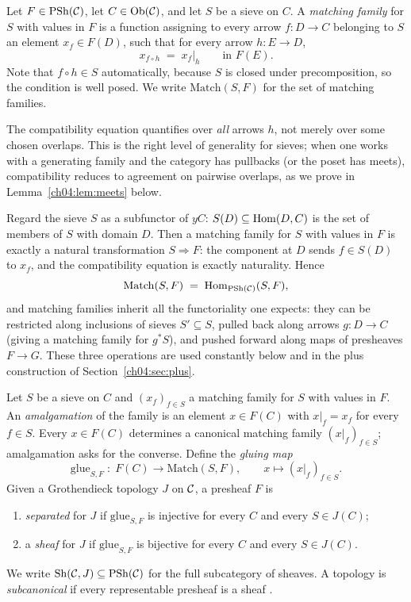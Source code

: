 \begin{definition}\label{ch04:def:matching}
Let $F\in\mathrm{PSh}(\mathcal{C})$, let $C\in\mathrm{Ob}(\mathcal{C})$, and let $S$ be a sieve on $C$. A
\emph{matching family} for $S$ with values in $F$ is a function assigning to
every arrow $f:D\to C$ belonging to $S$ an element $x_f\in F(D)$, such that
for every arrow $h:E\to D$,
\[
x_{f\circ h} \;=\; x_f|_h \qquad\text{in } F(E).
\]
Note that $f\circ h\in S$ automatically, because $S$ is closed under
precomposition, so the condition is well posed. We write
$\mathrm{Match}(S,F)$ for the set of matching families.
\end{definition}

The compatibility equation quantifies over \emph{all} arrows $h$, not merely
over some chosen overlaps. This is the right level of generality for sieves;
when one works with a generating family and the category has pullbacks (or the
poset has meets), compatibility reduces to agreement on pairwise overlaps, as
we prove in Lemma~\ref{ch04:lem:meets} below.

\begin{remark}\label{ch04:rem:nat}
Regard the sieve $S$ as a subfunctor of $yC$: $S(D)\subseteq\mathrm{Hom}(D,C)$ is the
set of members of $S$ with domain $D$. Then a matching family for $S$ with
values in $F$ is exactly a natural transformation $S\Rightarrow F$: the
component at $D$ sends $f\in S(D)$ to $x_f$, and the compatibility equation is
exactly naturality. Hence
\[
\mathrm{Match}(S,F)\;=\;\mathrm{Hom}_{\mathrm{PSh}(\mathcal{C})}(S,F),
\]
and matching families inherit all the functoriality one expects: they can be
restricted along inclusions of sieves $S'\subseteq S$, pulled back along
arrows $g:D\to C$ (giving a matching family for $g^{*}S$), and pushed forward
along maps of presheaves $F\to G$. These three operations are used constantly
below and in the plus construction of Section~\ref{ch04:sec:plus}.
\end{remark}

\begin{definition}\label{ch04:def:sheaf}
Let $S$ be a sieve on $C$ and $(x_f)_{f\in S}$ a matching family for $S$ with
values in $F$. An \emph{amalgamation} of the family is an element $x\in F(C)$
with $x|_f=x_f$ for every $f\in S$. Every $x\in F(C)$ determines a canonical
matching family $(x|_f)_{f\in S}$; amalgamation asks for the converse. Define
the \emph{gluing map}
\[
\mathrm{glue}_{S,F}\;:\;F(C)\longrightarrow \mathrm{Match}(S,F),\qquad
x\longmapsto (x|_f)_{f\in S}.
\]
Given a Grothendieck topology $J$ on $\mathcal{C}$, a presheaf $F$ is
\begin{enumerate}
\item \emph{separated} for $J$ if $\mathrm{glue}_{S,F}$ is injective for every
$C$ and every $S\in J(C)$;
\item a \emph{sheaf} for $J$ if $\mathrm{glue}_{S,F}$ is bijective for every
$C$ and every $S\in J(C)$.
\end{enumerate}
We write $\mathrm{Sh}(\mathcal{C},J)\subseteq\mathrm{PSh}(\mathcal{C})$ for the full subcategory of sheaves.
A topology is \emph{subcanonical} if every representable presheaf is a sheaf
\cite{maclane,stacks00WO}.
\end{definition}

